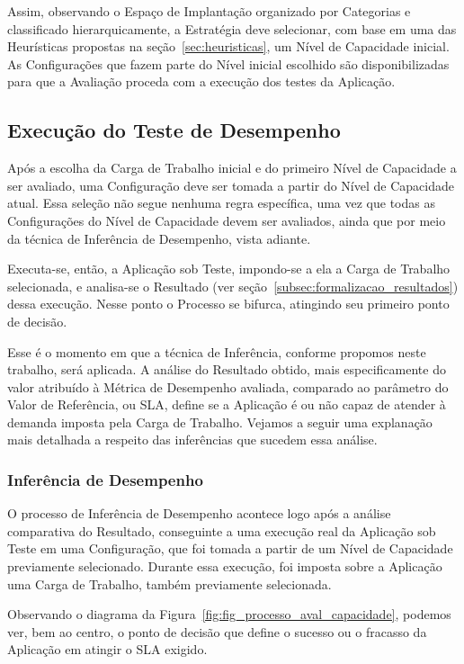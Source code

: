 Assim, observando o Espaço de Implantação organizado por Categorias e classificado
hierarquicamente, a Estratégia deve selecionar, com base em uma das Heurísticas 
propostas na seção~\ref{sec:heuristicas}, um Nível de Capacidade inicial. As 
Configurações que fazem parte do Nível inicial escolhido são disponibilizadas 
para que a Avaliação proceda com a execução dos testes da Aplicação.

\subsection{Execução do Teste de Desempenho}
Após a escolha da Carga de Trabalho inicial e do primeiro Nível de Capacidade a
ser avaliado, uma Configuração deve ser tomada a partir do Nível de Capacidade 
atual. Essa seleção não segue nenhuma regra específica, uma vez que todas as 
Configurações do Nível de Capacidade devem ser avaliados, ainda que por meio da técnica de 
Inferência de Desempenho, vista adiante.
 
Executa-se, então, a Aplicação sob Teste, impondo-se a ela a Carga de Trabalho 
selecionada, e analisa-se o Resultado (ver seção~\ref{subsec:formalizacao_resultados}) 
dessa execução. Nesse ponto o Processo se bifurca, atingindo seu primeiro ponto 
de decisão.

Esse é o momento em que a técnica de Inferência, conforme propomos neste trabalho,
será aplicada. A análise do Resultado obtido, mais especificamente do valor atribuído
à Métrica de Desempenho avaliada, comparado ao parâmetro do Valor de Referência, 
ou SLA, define se a Aplicação é ou não capaz de atender à demanda imposta pela
Carga de Trabalho. Vejamos a seguir uma explanação mais detalhada a respeito das
inferências que sucedem essa análise.  

\subsubsection{Inferência de Desempenho}
O processo de Inferência de Desempenho acontece logo após a análise comparativa
do Resultado, conseguinte a uma execução real da Aplicação sob Teste em uma 
Configuração, que foi tomada a partir de um Nível de Capacidade previamente 
selecionado. Durante essa execução, foi imposta sobre a Aplicação uma Carga de 
Trabalho, também previamente selecionada.

Observando o diagrama da Figura~\ref{fig:fig_processo_aval_capacidade}, podemos 
ver, bem ao centro, o ponto de decisão que define o sucesso ou o fracasso da 
Aplicação em atingir o SLA exigido. 

